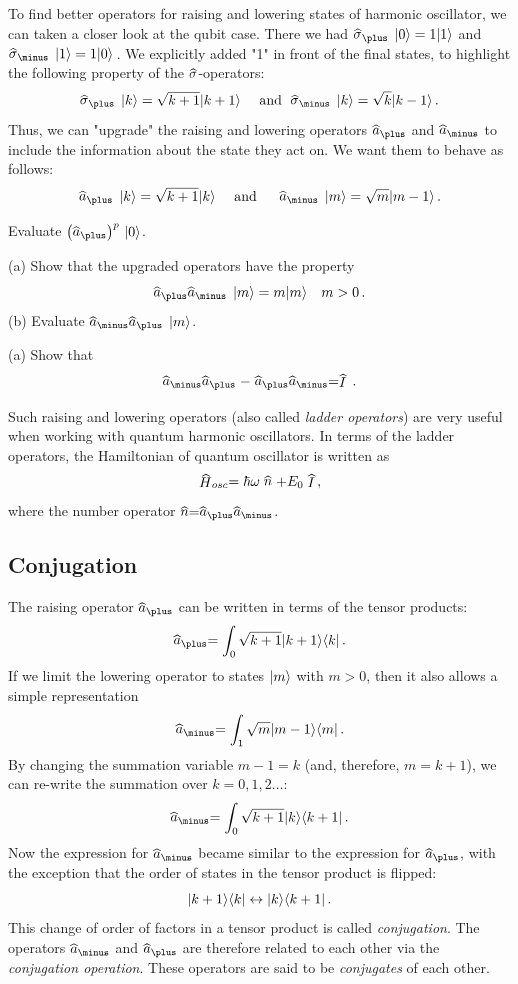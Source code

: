 To find better operators for raising and lowering states of harmonic oscillator, we can taken a closer look at the qubit case. There we had $\op{\sigma}_\plus\,\ket{0}=1\ket{1}$ and $\op{\sigma}_\minus\,\ket{1}=1\ket{0}$\,. We explicitly added "1" in front of the final states, to highlight the following property of the $\op{\sigma}$-operators:
\[
\op{\sigma}_\plus\,\ket{k}=\sqrt{k+1}\ket{k+1}\quad\textrm{ and } \op{\sigma}_\minus\,\ket{k}=\sqrt{k}\ket{k-1}\,.
\]
Thus, we can "upgrade" the raising and lowering operators $\op{a}_\plus$ and $\op{a}_\minus$ to include the information about the state they act on. We want them to behave as follows:
\[
\op{a}_\plus\,\ket{k}=\sqrt{k+1}\ket{k}\quad\textrm{ and }\quad \op{a}_\minus\,\ket{m}=\sqrt{m}\ket{m-1}\,.
\]
\begin{exercise}
	Evaluate $\left(\op{a}_\plus\right)^p\,\ket{0}$.
\end{exercise}
\begin{exercise}
	(a) Show that the upgraded operators have the property 
	\[
	\op{a}_\plus\op{a}_\minus\,\ket{m}=m\ket{m}\quad m>0\,.
	\]	
	(b) Evaluate $\op{a}_\minus\op{a}_\plus\,\ket{m}$.
\end{exercise}
\begin{exercise}
	(a) Show that 
	\[
	\op{a}_\minus\op{a}_\plus-\op{a}_\plus\op{a}_\minus=\op{I}\,.
	\]	
\end{exercise}

Such raising and lowering operators (also called \emph{ladder operators}) are very useful when working with quantum harmonic oscillators. In terms of the ladder operators, the Hamiltonian of quantum oscillator is written as
\[
\op{H}_{osc} = \hbar\omega\op{n}+E_0\op{I}\,,
\]
where the number operator $\op{n}=\op{a}_\plus\op{a}_\minus$. 


\subsection{Conjugation}
The raising operator $\op{a}_\plus$ can be written in terms of the tensor products:
\[
\op{a}_\plus=\int_0 \sqrt{k+1}\ketbra{k+1}{k}\,.
\]
If we limit the lowering operator to states $|{m}\rangle$ with $m>0$, then it also allows a simple representation
\[
\op{a}_\minus=\int_1 \sqrt{m}\ketbra{m-1}{m}\,.
\]
By changing the summation variable $m-1=k$ (and, therefore, $m=k+1$), we can re-write the summation over $k=0,1,2\ldots$:
\[
\op{a}_\minus=\int_0 \sqrt{k+1}\ketbra{k}{k+1}\,.
\]
Now the expression for $\op{a}_\minus$ became similar to the expression for $\op{a}_\plus$, with the exception that the order of states in the tensor product is flipped:
\[
|{k+1}\rangle\langle{k}|\leftrightarrow |{k}\rangle\langle{k+1}|\,.
\]
This change of order of factors in a tensor product is called \emph{conjugation}. The operators $\op{a}_\minus$ and $\op{a}_\plus$ are therefore related to each other via the \emph{conjugation operation}. These operators are said to be \emph{conjugates} of each other. 

